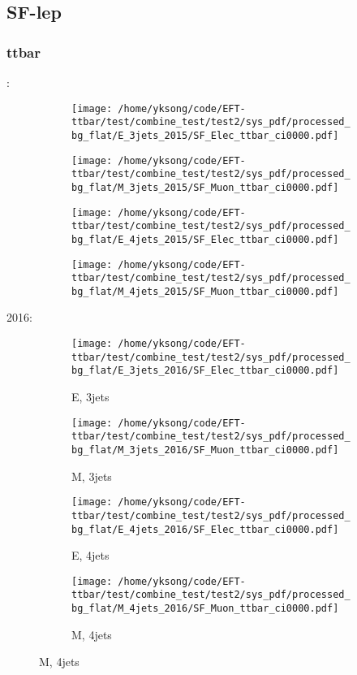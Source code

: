 \documentclass{beamer}
\begin{document}
\subsection{SF-lep}

\begin{frame}
\frametitle{ttbar}
\fontsize{5}{1}:
\begin{figure}
\centering
\begin{subfigure}[b]{0.24\textwidth}
\texttt{[image: /home/yksong/code/EFT-ttbar/test/combine\_test/test2/sys\_pdf/processed\_bg\_flat/E\_3jets\_2015/SF\_Elec\_ttbar\_ci0000.pdf]}
\end{subfigure}
\begin{subfigure}[b]{0.24\textwidth}
\texttt{[image: /home/yksong/code/EFT-ttbar/test/combine\_test/test2/sys\_pdf/processed\_bg\_flat/M\_3jets\_2015/SF\_Muon\_ttbar\_ci0000.pdf]}
\end{subfigure}
\begin{subfigure}[b]{0.24\textwidth}
\texttt{[image: /home/yksong/code/EFT-ttbar/test/combine\_test/test2/sys\_pdf/processed\_bg\_flat/E\_4jets\_2015/SF\_Elec\_ttbar\_ci0000.pdf]}
\end{subfigure}
\begin{subfigure}[b]{0.24\textwidth}
\texttt{[image: /home/yksong/code/EFT-ttbar/test/combine\_test/test2/sys\_pdf/processed\_bg\_flat/M\_4jets\_2015/SF\_Muon\_ttbar\_ci0000.pdf]}
\end{subfigure}
\end{figure}
2016:
\begin{figure}
\centering
\begin{subfigure}[b]{0.24\textwidth}
\texttt{[image: /home/yksong/code/EFT-ttbar/test/combine\_test/test2/sys\_pdf/processed\_bg\_flat/E\_3jets\_2016/SF\_Elec\_ttbar\_ci0000.pdf]}
\captionsetup{font=tiny}
\caption{E, 3jets}
\end{subfigure}
\begin{subfigure}[b]{0.24\textwidth}
\texttt{[image: /home/yksong/code/EFT-ttbar/test/combine\_test/test2/sys\_pdf/processed\_bg\_flat/M\_3jets\_2016/SF\_Muon\_ttbar\_ci0000.pdf]}
\captionsetup{font=tiny}
\caption{M, 3jets}
\end{subfigure}
\begin{subfigure}[b]{0.24\textwidth}
\texttt{[image: /home/yksong/code/EFT-ttbar/test/combine\_test/test2/sys\_pdf/processed\_bg\_flat/E\_4jets\_2016/SF\_Elec\_ttbar\_ci0000.pdf]}
\captionsetup{font=tiny}
\caption{E, 4jets}
\end{subfigure}
\begin{subfigure}[b]{0.24\textwidth}
\texttt{[image: /home/yksong/code/EFT-ttbar/test/combine\_test/test2/sys\_pdf/processed\_bg\_flat/M\_4jets\_2016/SF\_Muon\_ttbar\_ci0000.pdf]}
\captionsetup{font=tiny}
\caption{M, 4jets}
\end{subfigure}
\end{figure}
\end{frame}
\end{document}
